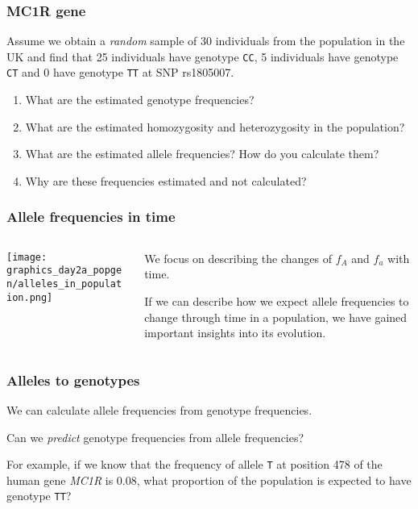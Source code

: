 \documentclass{beamer}
\newcommand{\1}{\ensuremath{\mathbf{1}}}
\begin{document}
%
%
%
\begin{frame}\frametitle{MC1R gene}
	Assume we obtain a \emph{random} sample of 30 individuals from the population in the UK and find that 25 individuals have genotype \texttt{CC}, 5 individuals have genotype \texttt{CT} and 0 have genotype \texttt{TT} at SNP rs1805007.
	\begin{enumerate}
		\item What are the estimated genotype frequencies?
		\item What are the estimated homozygosity and heterozygosity in the population?
		\item What are the estimated allele frequencies? How do you calculate them?
		\item Why are these frequencies estimated and not calculated?
	\end{enumerate}
\end{frame}
%
%
%
\begin{frame}\frametitle{Allele frequencies in time}
	\begin{columns}
	\begin{column}{.36\textwidth}
		\begin{center}
		\texttt{[image: graphics\_day2a\_popgen/alleles\_in\_population.png]}
		\end{center}
	\end{column}
	\begin{column}{.64\textwidth}
		\begin{block}{}
			We focus on describing the changes of $f_A$ and $f_a$ with time.
		\end{block}\vspace{2ex}
		If we can describe how we expect allele frequencies to change through time in a population, we have gained important insights into its evolution.
	\end{column}
	\end{columns}
\end{frame}
%
%
%
\begin{frame}\frametitle{Alleles to genotypes}
	We can calculate allele frequencies from genotype frequencies.
	\begin{block}{}
		Can we \emph{predict} genotype frequencies from allele frequencies?
	\end{block}
	For example, if we know that the frequency of allele \texttt{T} at position 478 of the human gene \emph{MC1R} is 0.08, what proportion of the population is expected to have genotype \texttt{TT}?
\end{frame}
\end{document}
